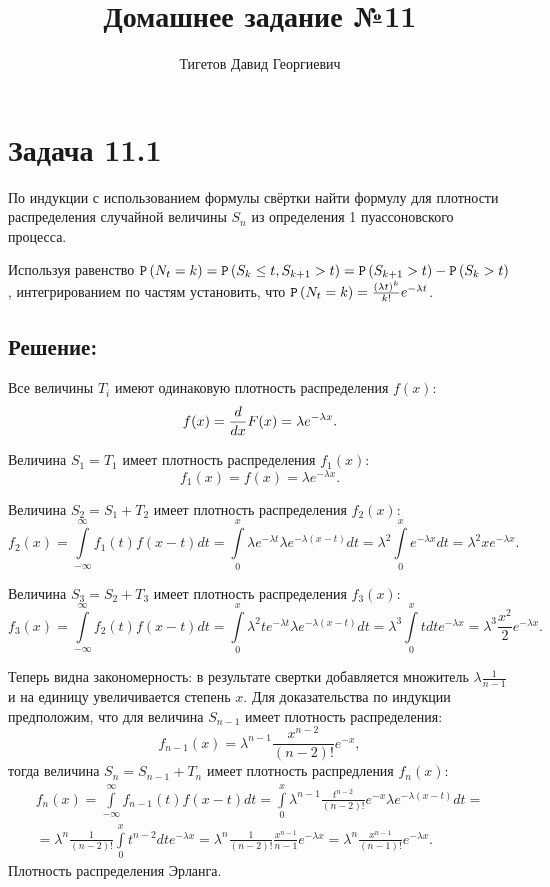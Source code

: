 \documentclass[12pt]{article}
\begin{document}
    \title{Домашнее задание №11}
    \author{Тигетов Давид Георгиевич}
    \date{}
    \maketitle

    \section*{Задача 11.1}
    По индукции с использованием формулы свёртки найти формулу для плотности распределения случайной величины $S_n$ из определения 1 пуассоновского процесса.

    Используя равенство $\mathtt{P} \left ( N_t = k \right ) = \mathtt{P} \left ( S_k \le t, S_{k+1} > t \right ) = \mathtt{P} \left ( S_{k+1} > t \right ) - \mathtt{P} \left ( S_k > t \right )$, интегрированием по частям установить,
    что $\mathtt{P} \left ( N_t = k \right ) = \frac{(\lambda t)^k}{k!} e^{-\lambda t}$.

    \subsection*{Решение:}
    Все величины $T_i$ имеют одинаковую плотность распределения $f(x)$:
    \[
        f(x) = \frac{d}{d x} F(x) = \lambda e^{-\lambda x} .
    \]

    Величина $S_1 = T_1$ имеет плотность распределения $f_1(x)$:
    \[
        f_1(x) = f(x) = \lambda e^{-\lambda x} .
    \]

    Величина $S_2 = S_1 + T_2$ имеет плотность распределения $f_2(x)$:
    \[
        f_2(x)
        = \int \limits_{-\infty}^{\infty} f_1(t) f(x-t) dt
        = \int \limits_0^x \lambda e^{- \lambda t} \lambda e^{- \lambda (x-t)} dt
        = \lambda^2 \int \limits_0^x e^{- \lambda x} dt
        = \lambda^2 x e^{- \lambda x} .
    \]

    Величина $S_3 = S_2 + T_3$ имеет плотность распределения $f_3(x)$:
    \[
        f_3(x)
        = \int \limits_{-\infty}^{\infty} f_2(t) f(x-t) dt
        = \int \limits_0^x \lambda^2 t e^{- \lambda t} \lambda e^{- \lambda (x-t)} dt
        = \lambda^3 \int \limits_0^x t dt e^{- \lambda x}
        = \lambda^3 \frac{x^2}{2} e^{- \lambda x} .
    \]

    Теперь видна закономерность: в результате свертки добавляется множитель $\lambda \frac{1}{n-1}$ и на единицу увеличивается степень $x$. Для доказательства по индукции предположим, что для величина $S_{n-1}$
    имеет плотность распределения:
    \[
        f_{n-1}(x) = \lambda^{n-1} \frac{x^{n-2}}{(n-2)!} e^{-x} ,
    \]
    тогда величина $S_n = S_{n-1} + T_n$ имеет плотность распредления $f_n(x)$:
    \begin{multline*}
        f_n(x)
        = \int \limits_{-\infty}^{\infty} f_{n-1}(t) f(x-t) dt
        = \int \limits_0^x \lambda^{n-1} \frac{t^{n-2}}{(n-2)!} e^{-x} \lambda e^{- \lambda (x - t )} dt = \\
        = \lambda^n \frac{1}{(n-2)!} \int \limits_0^x t^{n-2} dt e^{- \lambda x}
        = \lambda^n \frac{1}{(n-2)!} \frac{x^{n-1}}{n-1} e^{- \lambda x}
        = \lambda^n \frac{x^{n-1}}{(n-1)!} e^{- \lambda x} .
    \end{multline*}
    Плотность распределения Эрланга.
\end{document}
